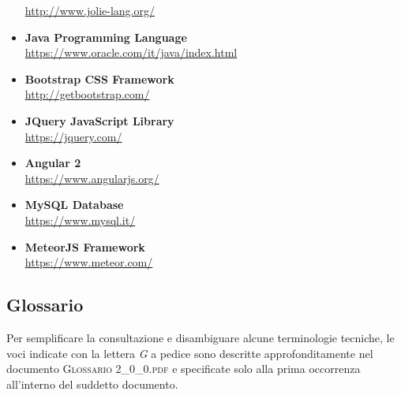 \begin{itemize}
	\url{http://www.jolie-lang.org/}
	\item \textbf{Java Programming Language}\\
	\url{https://www.oracle.com/it/java/index.html}
	\item \textbf{Bootstrap CSS Framework}\\
	\url{http://getbootstrap.com/}
	\item \textbf{JQuery JavaScript Library}\\
	\url{https://jquery.com/}
	\item \textbf{Angular 2}\\
	\url{https://www.angularjs.org/}
	\item \textbf{MySQL Database}\\
	\url{https://www.mysql.it/}
	\item \textbf{MeteorJS Framework}\\
	\url{https://www.meteor.com/}
\end{itemize}

\subsection{Glossario}
Per semplificare la consultazione e disambiguare alcune terminologie tecniche, le voci indicate con la lettera \textit{G} a pedice sono descritte approfonditamente nel documento \textsc{Glossario 2\_0\_0.pdf} e specificate solo alla prima occorrenza all'interno del suddetto documento.